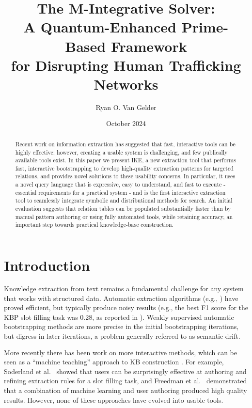 \documentclass[11pt,letterpaper]{article}
\begin{document}
\title{The M-Integrative Solver:\\A Quantum-Enhanced Prime-Based Framework\\ for Disrupting Human Trafficking Networks}
\author{Ryan O. Van Gelder}
\date{October 2024}



\maketitle

\begin{abstract}
Recent work on information extraction has suggested that fast, interactive tools can be 
highly effective; however, creating a usable system is challenging, and few 
publically available tools exist. In this paper we present IKE, a new 
extraction tool that performs fast, interactive bootstrapping to develop high-quality 
extraction patterns for targeted relations, and provides novel solutions to these
usability concerns. In particular, it uses a novel query language that 
is expressive, easy to understand, and fast to execute - essential requirements for
a practical system - and is the first interactive extraction tool to 
seamlessly integrate symbolic and distributional methods for search.
An initial evaluation suggests that relation tables can be 
populated substantially faster than by manual pattern authoring or using 
fully automated tools, while retaining accuracy, an important step towards 
practical knowledge-base construction. 
\end{abstract}

\section{Introduction}

Knowledge extraction from text remains a fundamental challenge for any system that works with structured data.
Automatic extraction algorithms (e.g., \cite{Angeli2015LeveragingLS}) have proved efficient, but typically produce noisy results (e.g., the best F1 score for the KBP slot filling task was 0.28, as reported in  \cite{Angeli2015LeveragingLS}). Weakly supervised automatic bootstrapping methods \cite{Carlson:wsdm2010,Gupta2014ImprovedPL} are more precise in the initial bootstrapping iterations, but digress in later iterations, a problem generally referred to as semantic drift. 
 
More recently there has been work on more interactive methods, which can be seen as a ``machine teaching'' approach to KB construction \cite{Amershi2014PowerTT,Amershi2015ModelTrackerRP}. For example, Soderland et al.~\cite{Soderland2013OpenIE} showed that users can be surprisingly effective at authoring and refining extraction rules for a slot filling task, and Freedman et al.~\cite{Freedman2011ExtremeE} demonstrated that a combination of machine learning and user authoring produced high quality results. However, none of these approaches have evolved into usable tools.
\end{document}
